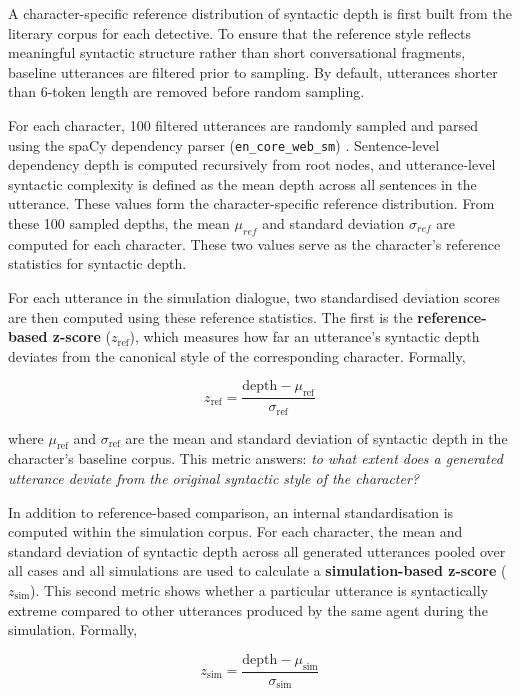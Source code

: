 \documentclass{article}
\begin{document}
A character-specific reference distribution of syntactic depth is first built from the literary corpus for each detective. To ensure that the reference style reflects meaningful syntactic structure rather than short conversational fragments, baseline utterances are filtered prior to sampling. By default, utterances shorter than 6-token length are removed before random sampling.  

For each character, 100 filtered utterances are randomly sampled and parsed using the spaCy dependency parser (\texttt{en\_core\_web\_sm}) \citep{spacy2}. Sentence-level dependency depth is computed recursively from root nodes, and utterance-level syntactic complexity is defined as the mean depth across all sentences in the utterance. These values form the character-specific reference distribution. From these 100 sampled depths, the mean $\mu_{ref}$ and standard deviation $\sigma_{ref}$ are computed for each character. These two values serve as the character's reference statistics for syntactic depth.

For each utterance in the simulation dialogue, two standardised deviation scores are then computed using these reference statistics. The first is the \textbf{reference-based z-score} ($z_{\mathrm{ref}}$), which measures how far an utterance's syntactic depth deviates from the canonical style of the corresponding character. Formally,

\begin{equation}
    z_{\mathrm{ref}} = \frac{\mathrm{depth} - \mu_{\mathrm{ref}}}{\sigma_{\mathrm{ref}}}
    \label{eq:reference-based z-score}
\end{equation}

where $\mu_{\mathrm{ref}}$ and $\sigma_{\mathrm{ref}}$ are the mean and standard deviation of syntactic depth in the character's baseline corpus. This metric answers: \emph{to what extent does a generated utterance deviate from the original syntactic style of the character?}

In addition to reference-based comparison, an internal standardisation is computed within the simulation corpus. For each character, the mean and standard deviation of syntactic depth across all generated utterances pooled over all cases and all simulations are used to calculate a \textbf{simulation-based z-score} ($z_{\mathrm{sim}}$). This second metric shows whether a particular utterance is syntactically extreme compared to other utterances produced by the same agent during the simulation. Formally,

\begin{equation}
    z_{\mathrm{sim}} = \frac{\mathrm{depth} - \mu_{\mathrm{sim}}}{\sigma_{\mathrm{sim}}}
    \label{eq:simulation-based z-score}
\end{equation}
\end{document}
